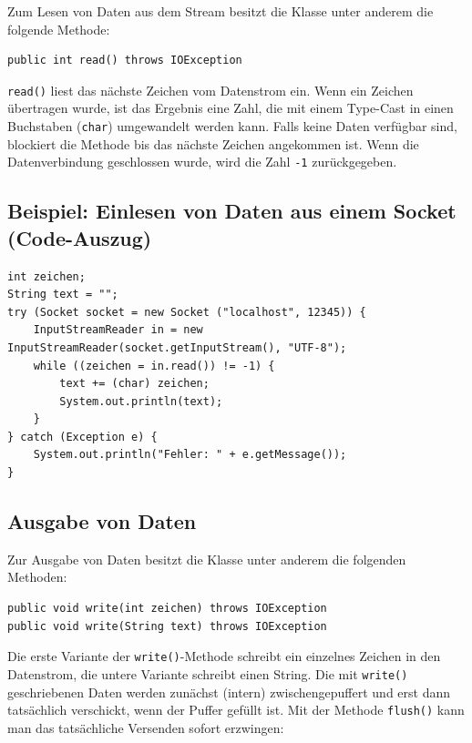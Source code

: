 Zum Lesen von Daten aus dem Stream besitzt die Klasse
 unter anderem die folgende Methode:

\begin{lstlisting}
public int read() throws IOException
\end{lstlisting}

\lstinline|read()| liest das nächste Zeichen vom Datenstrom ein. Wenn ein
Zeichen übertragen wurde, ist das Ergebnis eine Zahl, die mit einem Type-Cast
in einen Buchstaben (\lstinline|char|) umgewandelt werden kann. Falls keine
Daten verfügbar sind, blockiert die Methode bis das nächste Zeichen angekommen
ist. Wenn die Datenverbindung geschlossen wurde, wird die Zahl \lstinline|-1|
zurückgegeben.

\subsection{Beispiel: Einlesen von Daten aus einem Socket (Code-Auszug)}

\begin{lstlisting}
int zeichen;
String text = "";
try (Socket socket = new Socket ("localhost", 12345)) {
    InputStreamReader in = new InputStreamReader(socket.getInputStream(), "UTF-8"); 
    while ((zeichen = in.read()) != -1) {
        text += (char) zeichen;
        System.out.println(text);
    }	
} catch (Exception e) {
    System.out.println("Fehler: " + e.getMessage());
}
\end{lstlisting}

\subsection{Ausgabe von Daten}

Zur Ausgabe von Daten besitzt die Klasse  unter
anderem die folgenden Methoden:

\begin{lstlisting}
public void write(int zeichen) throws IOException
public void write(String text) throws IOException
\end{lstlisting}

Die erste Variante der \lstinline|write()|-Methode schreibt ein einzelnes
Zeichen in den Datenstrom, die untere Variante schreibt einen String. Die mit
\lstinline|write()| geschriebenen Daten werden zunächst (intern)
zwischengepuffert und erst dann tatsächlich verschickt, wenn der Puffer gefüllt
ist. Mit der Methode \lstinline|flush()| kann man das tatsächliche Versenden
sofort erzwingen:

